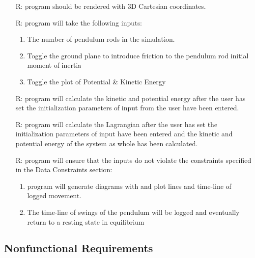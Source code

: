 \documentclass[12pt, titlepage]{article}
\newcounter{reqnum} %
\begin{document}
\noindent \begin{itemize}

\item[R\refstepcounter{reqnum}\thereqnum \label{3d}:] \progname 
program should be rendered with 3D Cartesian coordinates. 

\item[R\refstepcounter{reqnum}\thereqnum \label{funinput}:] \progname program 
  will take the following inputs: 
  \begin{enumerate}
   \item The number of pendulum rods in the simulation. 
   \item Toggle the ground plane to introduce friction to the
   pendulum rod initial moment of inertia
   \item Toggle the plot of Potential \& Kinetic Energy
  \end{enumerate}
                    
\item[R\refstepcounter{reqnum}\thereqnum \label{funkin}:] \progname program 
will calculate the kinetic and potential energy after the user has set the 
initialization parameters of input from the user have been entered.

\item[R\refstepcounter{reqnum}\thereqnum \label{funlagrang}:] \progname program 
will calculate the Lagrangian after the user has set the initialization 
parameters of input have been entered and the kinetic and potential energy of 
the system as whole has been calculated.

\item[R\refstepcounter{reqnum}\thereqnum \label{funplot}:] \progname program
will ensure that the inputs do not violate the constraints specified in the 
Data Constraints section:
    \begin{enumerate} \item \progname program will 
generate diagrams with and plot lines and time-line of logged movement. 
\item The time-line of swings of the pendulum will be logged and eventually
return to a resting state in equilibrium
\end{enumerate}

\end{itemize}
\newpage
\subsection{Nonfunctional Requirements}
\end{document}
